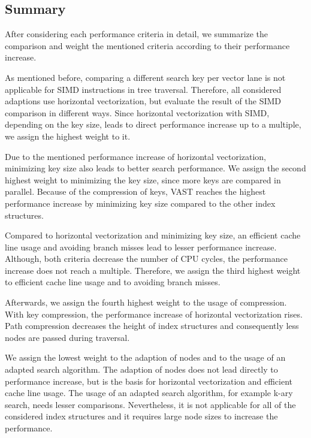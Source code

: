 \documentclass[runningheads,a4paper]{llncs}
\begin{document}
\subsection{Summary}

After considering each performance criteria in detail, we summarize the comparison and weight the mentioned criteria according to their performance increase. 

As mentioned before, comparing a different search key per vector lane is not applicable for SIMD instructions in tree traversal. Therefore, all considered adaptions use horizontal vectorization, but evaluate the result of the SIMD comparison in different ways. Since horizontal vectorization with SIMD, depending on the key size, leads to direct performance increase up to a multiple, we assign the highest weight to it. 

Due to the mentioned performance increase of horizontal vectorization, minimizing key size also leads to better search performance. We assign the second highest weight to minimizing the key size, since more keys are compared in parallel. Because of the compression of keys, VAST reaches the highest performance increase by minimizing key size compared to the other index structures. 

Compared to horizontal vectorization and minimizing key size, an efficient cache line usage and avoiding branch misses lead to lesser performance increase. Although, both criteria decrease the number of CPU cycles, the performance increase does not reach a multiple. Therefore, we assign the third highest weight to efficient cache line usage and to avoiding branch misses.

Afterwards, we assign the fourth highest weight to the usage of compression. With key compression, the performance increase of horizontal vectorization rises. Path compression decreases the height of index structures and consequently less nodes are passed during traversal. 

We assign the lowest weight to the adaption of nodes and to the usage of an adapted search algorithm. The adaption of nodes does not lead directly to performance increase, but is the basis for horizontal vectorization and efficient cache line usage. The usage of an adapted search algorithm, for example k-ary search, needs lesser comparisons. Nevertheless, it is not applicable for all of the considered index structures and it requires large node sizes to increase the performance.  
\end{document}
